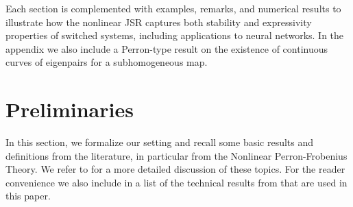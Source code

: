 \documentclass{article}
\begin{document}
Each section is complemented with examples, remarks, and numerical results to illustrate how the nonlinear JSR captures both stability and expressivity properties of switched systems, including applications to neural networks. In the appendix  we also include a Perron-type result on the existence of continuous curves of eigenpairs for a subhomogeneous map.





\section{Preliminaries}\label{SEC:preliminaries}
%
%
In this section, we formalize our setting and recall some basic results and definitions from the literature, in particular from the Nonlinear Perron-Frobenius Theory. We refer to \cite{lemmens2012nonlinear} for a more detailed discussion of these topics. For the reader convenience we also include in  a list of the technical results from \cite{lemmens2012nonlinear} that are used in this paper.
\end{document}
